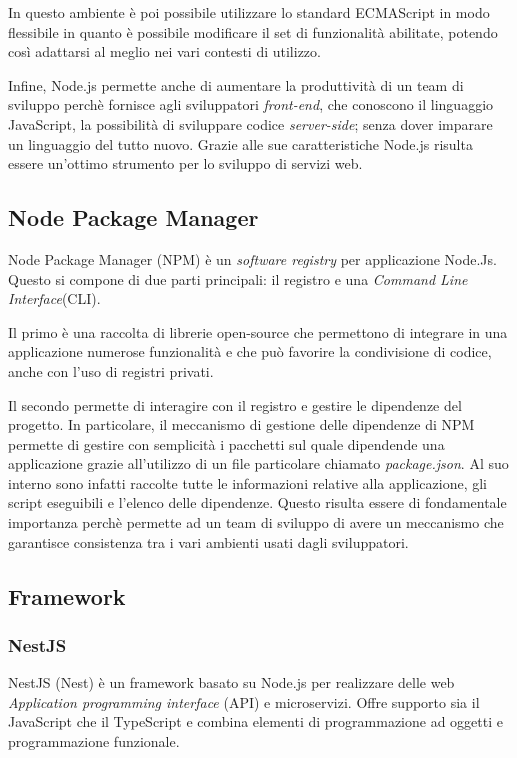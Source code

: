 In questo ambiente è poi possibile utilizzare lo standard ECMAScript in modo flessibile in quanto è possibile modificare il set di funzionalità abilitate,
potendo così adattarsi al meglio nei vari contesti di utilizzo.

Infine, Node.js permette anche di aumentare la produttività di un team di sviluppo perchè fornisce agli sviluppatori \textit{front-end},
che conoscono il linguaggio JavaScript, la possibilità di sviluppare codice \textit{server-side}; senza dover imparare un linguaggio del tutto nuovo.
Grazie alle sue caratteristiche Node.js risulta essere un'ottimo strumento per lo sviluppo di servizi web.

\subsection{Node Package Manager}
Node Package Manager\cite{NPM} (NPM) è un \textit{software registry} per applicazione Node.Js.
Questo si compone di due parti principali: il registro e una \textit{Command Line Interface}(CLI).

Il primo è una raccolta di librerie open-source che permettono di integrare in una applicazione
numerose funzionalità e che può favorire la condivisione di codice, anche con l'uso di registri privati.

Il secondo permette di interagire con il registro e gestire le dipendenze del progetto.
In particolare, il meccanismo di gestione delle dipendenze di NPM permette di gestire con
semplicità i pacchetti sul quale dipendende una applicazione
grazie all'utilizzo di un file particolare chiamato \textit{package.json}. Al suo interno
sono infatti raccolte tutte le informazioni relative
alla applicazione, gli script eseguibili e l'elenco delle dipendenze.
Questo risulta essere di fondamentale importanza perchè permette ad un team di sviluppo di
avere un meccanismo che garantisce consistenza tra i vari ambienti usati dagli sviluppatori.


\subsection{Framework}
\subsubsection{NestJS}
NestJS \cite{NestJS} (Nest) è un framework basato su Node.js per realizzare delle web \textit{Application programming interface} (API) e microservizi.
Offre supporto sia il JavaScript che il TypeScript e combina elementi di programmazione ad oggetti e programmazione funzionale.

